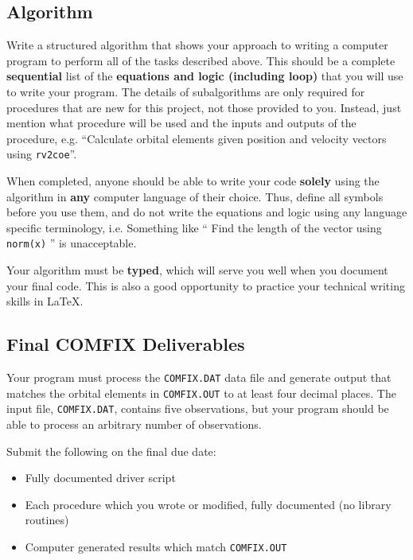 \documentclass[11pt, reqno]{article}    %
\begin{document}
\subsection*{Algorithm}

Write a structured algorithm that shows your approach to writing a computer program to perform all of the tasks described above.
This should be a complete \textbf{sequential} list of the \textbf{equations and logic (including loop)} that you will use to write your program.
The details of subalgorithms are only required for procedures that are new for this project, not those provided to you.
Instead, just mention what procedure will be used and the inputs and outputs of the procedure, e.g. ``Calculate orbital elements given position and velocity vectors using \texttt{rv2coe}''.

When completed, anyone should be able to write your code \textbf{solely} using the algorithm in \textbf{any} computer language of their choice.
Thus, define all symbols before you use them, and do not write the equations and logic using any language specific terminology, i.e. Something like `` Find the length of the vector using \texttt{norm(x)} '' is unacceptable.

Your algorithm must be \textbf{typed}, which will serve you well when you document your final code. 
This is also a good opportunity to practice your technical writing skills in \LaTeX.

\subsection*{Final COMFIX Deliverables}

Your program must process the \texttt{COMFIX.DAT} data file and generate output that matches the orbital elements in \texttt{COMFIX.OUT} to at least four decimal places. 
The input file, \texttt{COMFIX.DAT}, contains five observations, but your program should be able to process an arbitrary number of observations.

Submit the following on the final due date:
\begin{itemize}
    \item Fully documented driver script
    \item Each procedure which you wrote or modified, fully documented (no library routines)
    \item Computer generated results which match \texttt{COMFIX.OUT}
\end{itemize}
\end{document}
